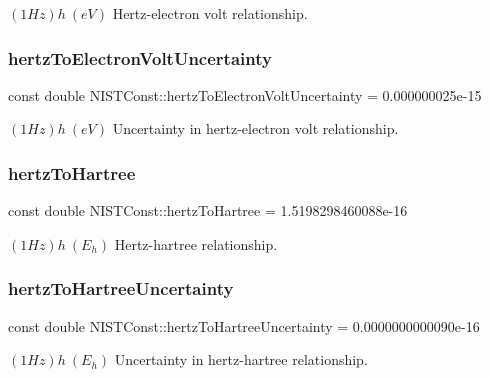 $(1 Hz)h \ (eV)$ Hertz-\/electron volt relationship. \mbox{\label{group___hertz_ga695a041e052cf0684ddbf956b7b8df80}} 
\subsubsection{\texorpdfstring{hertz\+To\+Electron\+Volt\+Uncertainty}{hertzToElectronVoltUncertainty}}
{\footnotesize\ttfamily const double N\+I\+S\+T\+Const\+::hertz\+To\+Electron\+Volt\+Uncertainty = 0.\+000000025e-\/15}

$(1 Hz)h \ (eV)$ Uncertainty in hertz-\/electron volt relationship. \mbox{\label{group___hertz_ga2ededb8b750b44cde6d83c1c07b6a870}} 
\subsubsection{\texorpdfstring{hertz\+To\+Hartree}{hertzToHartree}}
{\footnotesize\ttfamily const double N\+I\+S\+T\+Const\+::hertz\+To\+Hartree = 1.\+5198298460088e-\/16}

$(1 Hz)h \ (E_h)$ Hertz-\/hartree relationship. \mbox{\label{group___hertz_gaa2e1f37030bea54753040b6728792d90}} 
\subsubsection{\texorpdfstring{hertz\+To\+Hartree\+Uncertainty}{hertzToHartreeUncertainty}}
{\footnotesize\ttfamily const double N\+I\+S\+T\+Const\+::hertz\+To\+Hartree\+Uncertainty = 0.\+0000000000090e-\/16}

$(1 Hz)h \ (E_h)$ Uncertainty in hertz-\/hartree relationship. \mbox{\label{group___hertz_ga6d5ccd7fed8ad7f2abb5c368565a1666}} 
